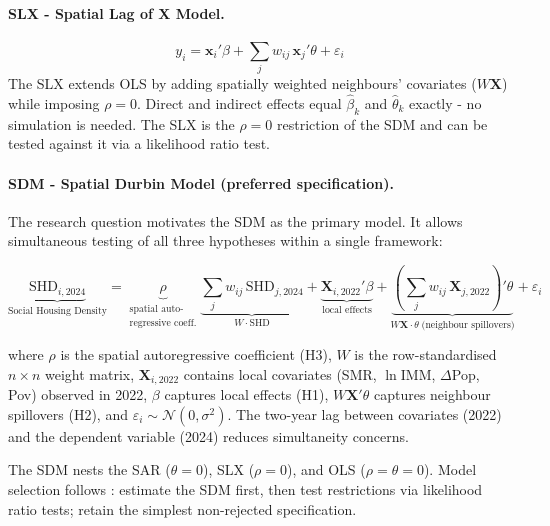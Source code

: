 \documentclass[a4paper,12pt]{article}
\begin{document}
\paragraph{SLX - Spatial Lag of X Model.}
\begin{equation}
y_i = \mathbf{x}_i'\beta + \sum_j w_{ij}\,\mathbf{x}_j'\theta + \varepsilon_i
\label{eq:slx}
\end{equation}
The SLX extends OLS by adding spatially weighted neighbours' covariates ($W\mathbf{X}$) while imposing $\rho = 0$. Direct and indirect effects equal $\hat{\beta}_k$ and $\hat{\theta}_k$ exactly - no simulation is needed. The SLX is the $\rho = 0$ restriction of the SDM and can be tested against it via a likelihood ratio test.

\paragraph{SDM - Spatial Durbin Model (preferred specification).}

The research question motivates the SDM as the primary model. It allows simultaneous testing of all three hypotheses within a single framework:

\begin{equation}
\underbrace{\mathrm{SHD}_{i,2024}}_{\text{Social Housing Density}} =
  \underbrace{\rho}_{\substack{\text{spatial auto-}\\\text{regressive coeff.}}}
  \underbrace{\sum_j w_{ij}\,\mathrm{SHD}_{j,2024}}_{W \cdot \mathrm{SHD}} +
  \underbrace{\mathbf{X}_{i,2022}'\beta}_{\text{local effects}} +
  \underbrace{\left(\sum_j w_{ij}\,\mathbf{X}_{j,2022}\right)'\theta}_{W\mathbf{X} \cdot \theta \;\text{(neighbour spillovers)}} +
  \varepsilon_i
\label{eq:sdm}
\end{equation}

where $\rho$ is the spatial autoregressive coefficient (H3), $W$ is the row-standardised $n \times n$ weight matrix, $\mathbf{X}_{i,2022}$ contains local covariates (SMR, $\ln$IMM, $\Delta$Pop, Pov) observed in 2022, $\beta$ captures local effects (H1), ${W\mathbf{X}}'{\theta}$ captures neighbour spillovers (H2), and $\varepsilon_i \sim \mathcal{N}(0,\sigma^2)$. The two-year lag between covariates (2022) and the dependent variable (2024) reduces simultaneity concerns.

\medskip
The SDM nests the SAR ($\theta = 0$), SLX ($\rho = 0$), and OLS ($\rho = \theta = 0$). Model selection follows \citet{elhorst2010}: estimate the SDM first, then test restrictions via likelihood ratio tests; retain the simplest non-rejected specification.
\end{document}
